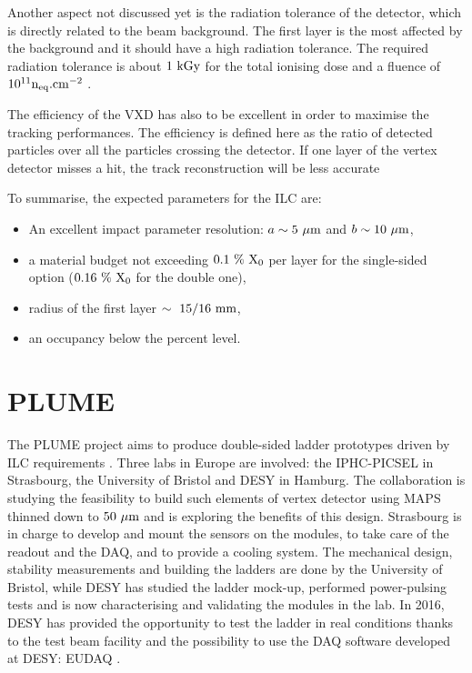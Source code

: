    Another aspect not discussed yet is the radiation tolerance of the detector, which is directly related to the beam background.
   The first layer is the most affected by the background and it should have a high radiation tolerance. 
   The required radiation tolerance is about $1~\rm{kGy}$ for the total ionising dose and a fluence of $10^{11}\rm{n}_{\rm{eq}}\rm{.cm}^{-2}$ \cite{Behnke2013}.

   The efficiency of the \gls{VXD} has also to be excellent in order to maximise the tracking performances.
   The efficiency is defined here as the ratio of detected particles over all the particles crossing the detector.
   If one layer of the vertex detector misses a hit, the track reconstruction will be less accurate 
   
   To summarise, the expected parameters for the \gls{ILC} are: 
   \begin{itemize}
     \item An excellent impact parameter resolution: $a \sim 5~\rm{\mu m}$ and $b \sim 10~\rm{\mu m}$,
     \item a material budget not exceeding $0.1~\%~\rm{X_0}$ per layer for the single-sided option ($0.16~\%~\rm{X_0}$ for the double one),
     \item radius of the first layer $\sim~15/16~\rm{mm}$,
     \item an occupancy below the percent level.
   \end{itemize}

  \section{PLUME}

  The \acrfull{PLUME} project aims to produce double-sided ladder prototypes driven by \gls{ILC} requirements \cite{PLUME}.
  Three labs in Europe are involved: the \gls{IPHC}-\gls{PICSEL} in Strasbourg, the University of Bristol and \gls{DESY} in Hamburg.
  The collaboration is studying the feasibility to build such elements of vertex detector using \gls{MAPS} thinned down to $50~\rm{\mu m}$ and is exploring the benefits of this design.
  Strasbourg is in charge to develop and mount the sensors on the modules, to take care of the readout and the \gls{DAQ}, and to provide a cooling system.
  The mechanical design, stability measurements and building the ladders are done by the University of Bristol, while \gls{DESY} has studied the ladder mock-up, performed power-pulsing tests and is now characterising and validating the modules in the lab.
  In 2016, DESY has provided the opportunity to test the ladder in real conditions thanks to the test beam facility and the possibility to use the \gls{DAQ} software developed at DESY: EUDAQ \cite{EUDAQ}.

